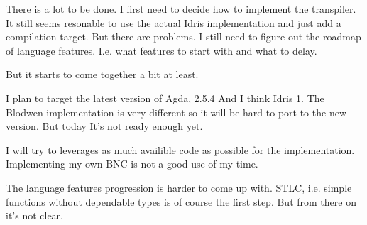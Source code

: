 \documentclass{scrartcl}
\begin{document}





There is a lot to be done. I first need to decide how to implement the
transpiler. It still seems resonable to use the actual Idris implementation and
just add a compilation target. But there are problems. I still need to figure
out the roadmap of language features. I.e. what features to start with and what
to delay.

But it starts to come together a bit at least.

I plan to target the latest version of Agda, 2.5.4
And I think Idris 1. The Blodwen implementation is very different so it will be
hard to port to the new version. But today It's not ready enough yet.

I will try to leverages as much availible code as possible for the
implementation. Implementing my own BNC is not a good use of my time.

The language features progression is harder to come up with. STLC, i.e. simple
functions without dependable types is of course the first step. But from there
on it's not clear.






\end{document}
